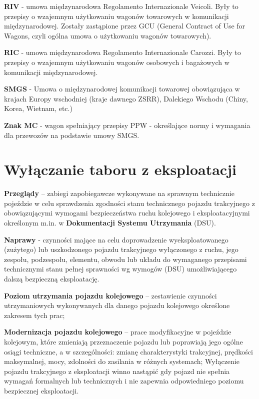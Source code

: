 \textbf{RIV} - umowa międzynarodowa Regolamento Internazionale Veicoli. Były to przepisy o wzajemnym użytkowaniu wagonów towarowych w komunikacji międzynarodowej. Zostały zastąpione przez GCU (General Contract of Use for Wagons, czyli ogólna umowa o użytkowaniu wagonów towarowych).

\textbf{RIC} - umowa międzynarodowa Regolamento Internazionale Carozzi. Były to przepisy o wzajemnym użytkowaniu wagonów osobowych i bagażowych w komunikacji międzynarodowej.

\textbf{SMGS} - Umowa o międzynarodowej komunikacji towarowej obowiązująca w krajach Europy wschodniej (kraje dawnego ZSRR), Dalekiego Wschodu (Chiny, Korea, Wietnam, etc.) 

\textbf{Znak MC} - wagon spełniający przepisy PPW - określające normy i wymagania dla przewozów na podstawie umowy SMGS. 


\section{Wyłączanie taboru z eksploatacji}

\textbf{Przeglądy} – zabiegi zapobiegawcze wykonywane na sprawnym technicznie pojeździe w celu sprawdzenia zgodności stanu technicznego pojazdu trakcyjnego z obowiązującymi wymogami bezpieczeństwa ruchu kolejowego i eksploatacyjnymi określonym m.in. w \textbf{Dokumentacji Systemu Utrzymania} (DSU).

\textbf{Naprawy} - czynności mające na celu doprowadzenie wyeksploatowanego (zużytego) lub uszkodzonego pojazdu trakcyjnego wyłączonego z ruchu, jego zespołu, podzespołu, elementu, obwodu lub układu do wymaganego przepisami technicznymi stanu pełnej sprawności wg wymogów (DSU) umożliwiającego dalszą bezpieczną eksploatację.

\textbf{Poziom utrzymania pojazdu kolejowego} – zestawienie czynności utrzymaniowych wykonywanych dla danego pojazdu kolejowego określone zakresem tych prac;

\textbf{Modernizacja pojazdu kolejowego} – prace modyfikacyjne w pojeździe kolejowym, które zmieniają przeznaczenie pojazdu lub poprawiają jego ogólne osiągi techniczne, a w szczególności: zmianę charakterystyki trakcyjnej, prędkości maksymalnej, mocy, zdolności do zasilania w różnych systemach;
Wyłączenie pojazdu trakcyjnego z eksploatacji winno nastąpić gdy pojazd nie spełnia wymagań formalnych lub technicznych i nie zapewnia odpowiedniego poziomu bezpiecznej eksploatacji.

